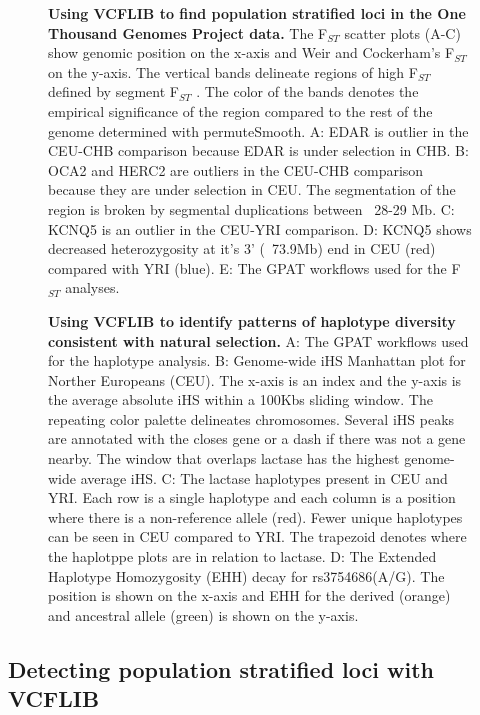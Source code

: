 \documentclass[10pt,letterpaper]{article}
\begin{document}
\begin{figure}[h]

\caption{{\bf Using VCFLIB to find population stratified loci in the One Thousand Genomes Project data.} The  F$_{ST}$  scatter plots (A-C) show genomic position on the x-axis and Weir and Cockerham's  F$_{ST}$  on the y-axis.  The vertical bands delineate regions of high  F$_{ST}$  defined by segment F$_{ST}$ .  The color of the bands denotes the empirical significance of the region compared to the rest of the genome determined with permuteSmooth.  A: EDAR is outlier in the CEU-CHB comparison because EDAR is under selection in CHB.  B: OCA2 and HERC2 are outliers in the CEU-CHB comparison because they are under selection in CEU.  The segmentation of the region is broken by segmental duplications between ~28-29 Mb.  C: KCNQ5 is an outlier in the CEU-YRI comparison.  D:  KCNQ5 shows decreased heterozygosity at it's 3' (~73.9Mb) end in CEU (red) compared with YRI (blue).  E: The GPAT workflows used for the F$_{ST}$  analyses.}
\label{fig1}
\end{figure}

\begin{figure}[h]

\caption{{\bf Using VCFLIB to identify patterns of haplotype diversity consistent with natural selection.} A: The GPAT 
workflows used for the haplotype analysis. B: Genome-wide iHS Manhattan plot for Norther Europeans (CEU).  The x-axis is an index and the y-axis is the average absolute iHS within a 100Kbs sliding window.  The repeating color palette delineates chromosomes.  Several iHS peaks are annotated with the closes gene or a dash if there was not a gene nearby. The window that overlaps lactase has the highest genome-wide average iHS.  C: The lactase haplotypes present in CEU and YRI.  Each row is a single haplotype and each column is a position where there is a non-reference allele (red).  Fewer unique haplotypes can be seen in CEU compared to YRI.   The trapezoid denotes where the haplotppe plots are in relation to lactase. D:  The Extended Haplotype Homozygosity (EHH) decay for rs3754686(A/G).  The position is shown on the x-axis and EHH for the derived (orange) and ancestral allele (green) is shown on the y-axis.}
\label{fig2}
\end{figure}

\subsection*{Detecting population stratified loci with VCFLIB}
\end{document}
